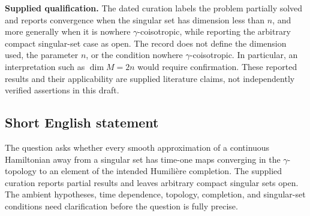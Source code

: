 \documentclass[11pt]{article}
\begin{document}
\textbf{Supplied qualification.} The dated curation labels the problem partially solved and reports convergence when the singular set has dimension less than \(n\), and more generally when it is nowhere \(\gamma\)-coisotropic, while reporting the arbitrary compact singular-set case as open. The record does not define the dimension used, the parameter \(n\), or the condition nowhere \(\gamma\)-coisotropic. In particular, an interpretation such as \(\dim M=2n\) would require confirmation. These reported results and their applicability are supplied literature claims, not independently verified assertions in this draft.
\subsection{Short English statement}
The question asks whether every smooth approximation of a continuous Hamiltonian away from a singular set has time-one maps converging in the \(\gamma\)-topology to an element of the intended Humili\`ere completion. The supplied curation reports partial results and leaves arbitrary compact singular sets open. The ambient hypotheses, time dependence, topology, completion, and singular-set conditions need clarification before the question is fully precise.
\end{document}
